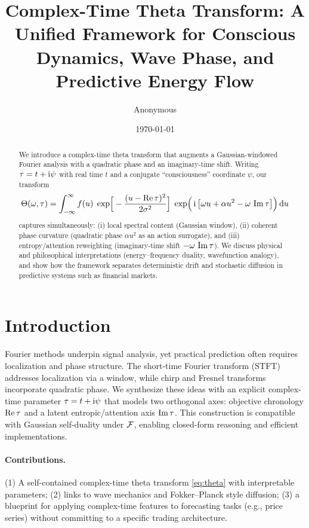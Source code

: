 \documentclass[11pt]{article}
\title{Complex-Time Theta Transform: A Unified Framework for Conscious Dynamics, Wave Phase, and Predictive Energy Flow}
\author{Anonymous}
\date{\today}
\begin{document}
\maketitle

\begin{abstract}
We introduce a complex-time theta transform that augments a Gaussian-windowed Fourier analysis with a quadratic phase and an imaginary-time shift. Writing $\tau=t+\mathrm{i} \psi$ with real time $t$ and a conjugate ``consciousness'' coordinate $\psi$, our transform
\begin{equation}
\Theta(\omega,\tau)
= \int_{-\infty}^{\infty} f(u)\;
\exp\!\Big[-\frac{(u-\operatorname{Re}\tau)^2}{2\sigma^2}\Big]\;
\exp\!\Big(\,\mathrm{i}\,\big[\omega u + \alpha u^2 - \omega\,\operatorname{Im}\tau\big]\Big)\,\mathrm{d} u
\label{eq:theta}
\end{equation}
captures simultaneously: (i) local spectral content (Gaussian window), (ii) coherent phase curvature (quadratic phase $\alpha u^2$ as an action surrogate), and (iii) entropy/attention reweighting (imaginary-time shift $-\omega\,\operatorname{Im}\tau$). We discuss physical and philosophical interpretations (energy--frequency duality, wavefunction analogy), and show how the framework separates deterministic drift and stochastic diffusion in predictive systems such as financial markets.
\end{abstract}

\section{Introduction}
Fourier methods underpin signal analysis, yet practical prediction often requires localization and phase structure. The short-time Fourier transform (STFT) addresses localization via a window, while chirp and Fresnel transforms incorporate quadratic phase. We synthesize these ideas with an explicit complex-time parameter $\tau=t+\mathrm{i}\psi$ that models two orthogonal axes: objective chronology $\operatorname{Re}\tau$ and a latent entropic/attention axis $\operatorname{Im}\tau$. This construction is compatible with Gaussian self-duality under $\mathcal{F}$, enabling closed-form reasoning and efficient implementations.

\paragraph{Contributions.}
(1) A self-contained complex-time theta transform \eqref{eq:theta} with interpretable parameters; (2) links to wave mechanics and Fokker--Planck style diffusion; (3) a blueprint for applying complex-time features to forecasting tasks (e.g., price series) without committing to a specific trading architecture.
\end{document}
